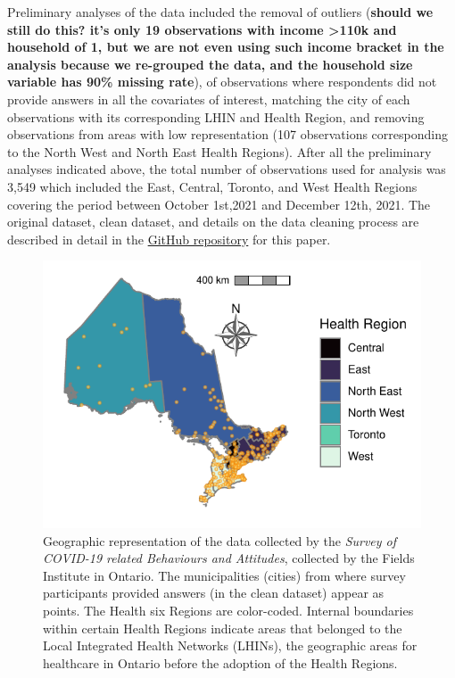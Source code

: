 \documentclass[
  letterpaper,
  DIV=11,
  numbers=noendperiod]{scrartcl}
\begin{document}
Preliminary analyses of the data included the removal of outliers
(\textbf{should we still do this? it's only 19 observations with income
\textgreater110k and household of 1, but we are not even using such
income bracket in the analysis because we re-grouped the data, and the
household size variable has 90\% missing rate}), of observations where
respondents did not provide answers in all the covariates of interest,
matching the city of each observations with its corresponding LHIN and
Health Region, and removing observations from areas with low
representation (107 observations corresponding to the North West and
North East Health Regions). After all the preliminary analyses indicated
above, the total number of observations used for analysis was 3,549
which included the East, Central, Toronto, and West Health Regions
covering the period between October 1st,2021 and December 12th, 2021.
The original dataset, clean dataset, and details on the data cleaning
process are described in detail in the
\href{https://github.com/aimundo/Fields_COVID-19/}{GitHub repository}
for this paper.

\begin{figure}

{\centering \includegraphics{../data/map_data/map.pdf}

}

\caption{\label{fig-map}Geographic representation of the data collected
by the \emph{Survey of COVID-19 related Behaviours and Attitudes},
collected by the Fields Institute in Ontario. The municipalities
(cities) from where survey participants provided answers (in the clean
dataset) appear as points. The Health six Regions are color-coded.
Internal boundaries within certain Health Regions indicate areas that
belonged to the Local Integrated Health Networks (LHINs), the geographic
areas for healthcare in Ontario before the adoption of the Health
Regions.}

\end{figure}
\end{document}
